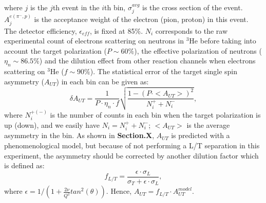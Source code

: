  where $j$ is the $j$th event in the $i$th bin, $\sigma^{avg}_{j}$ is the cross section of the event. $A^{e(\pi^{-},p)}_{j}$ is the acceptance weight of the electron (pion, proton) in this event. The detector efficiency, $\epsilon_{eff}$, is fixed at 85\%. $N_{i}$ corresponds to the raw experimental count of electrons scattering on neutrons in $\mathrm{^{3}He}$ before taking into account the target polarization ($P\sim60\%$), the effective polarization of neutrons ($\eta_{n}\sim86.5\%$) and the dilution effect from other reaction channels when electrons scattering on $\mathrm{^{3}He}$ ($f \sim 90\%$). The statistical error of the target single spin asymmetry ($A_{UT}$) in each bin can be given as:
  \begin{equation}
    \delta A_{UT} = \frac{1}{P\cdot\eta_{n}\cdot f} \sqrt{\frac{1-(P\cdot <A_{UT}>)^{2}}{N^{+}_{i}+N^{-}_{i}}},
    \label{stat_err}
 \end{equation}
 where $N^{+(-)}_{i}$ is the number of counts in each bin when the target polarization is up (down), and we easily have $N_{i}=N^{+}_{i}+N^{-}_{i}$; $<A_{UT}>$ is the average asymmetry in the bin. As shown in {\bf Section.X},  $A_{UT}$ is predicted with a phenomenological model, but because of not performing a L/T separation in this experiment, the asymmetry should be corrected by another dilution factor which is defined as:
\begin{equation}
  f_{L/T} =\frac{\epsilon\cdot\sigma_{L} }{\sigma_{T}+\epsilon\cdot\sigma_{L} },
\end{equation} 
where $\epsilon=1/(1+\frac{2\nu}{Q^{2}}tan^{2}(\theta))$. Hence, $A_{UT} = f_{L/T}\cdot A_{UT}^{model}$.

